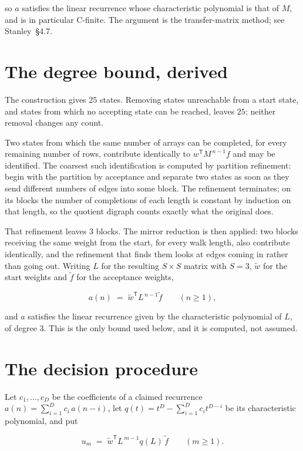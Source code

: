 \documentclass[11pt]{article}
\theoremstyle{definition}
\begin{document}
so $a$ satisfies the linear recurrence whose characteristic polynomial is that of $M$, and is in particular C-finite. The argument is the transfer-matrix method; see Stanley~\S4.7.

\section{The degree bound, derived}

The construction gives $25$ states. Removing states unreachable from a start state, and states from which no accepting state can be reached, leaves $25$; neither removal changes any count.

Two states from which the same number of arrays can be completed, for every remaining number of rows, contribute identically to $w^{\mathsf T}M^{\,n-1}f$ and may be identified. The coarsest such identification is computed by partition refinement: begin with the partition by acceptance and separate two states as soon as they send different numbers of edges into some block. The refinement terminates; on its blocks the number of completions of each length is constant by induction on that length, so the quotient digraph counts exactly what the original does.

That refinement leaves $3$ blocks. The mirror reduction is then applied: two blocks receiving the same weight from the start, for every walk length, also contribute identically, and the refinement that finds them looks at edges coming in rather than going out. Writing $L$ for the resulting $S \times S$ matrix with $S = 3$, $\tilde w$ for the start weights and $\tilde f$ for the acceptance weights,

\[a(n) \;=\; \tilde w^{\mathsf T} L^{\,n-1} \tilde f \qquad (n \ge 1),\]

and $a$ satisfies the linear recurrence given by the characteristic polynomial of $L$, of degree $3$. This is the only bound used below, and it is computed, not assumed.

\section{The decision procedure}

Let $c_1,\dots,c_D$ be the coefficients of a claimed recurrence $a(n) = \sum_{i=1}^{D} c_i\,a(n-i)$, let $q(t) = t^{D} - \sum_{i=1}^{D} c_i t^{D-i}$ be its characteristic polynomial, and put

\[u_m \;=\; \tilde w^{\mathsf T} L^{\,m-1} q(L)\,\tilde f \qquad (m \ge 1).\]
\end{document}
